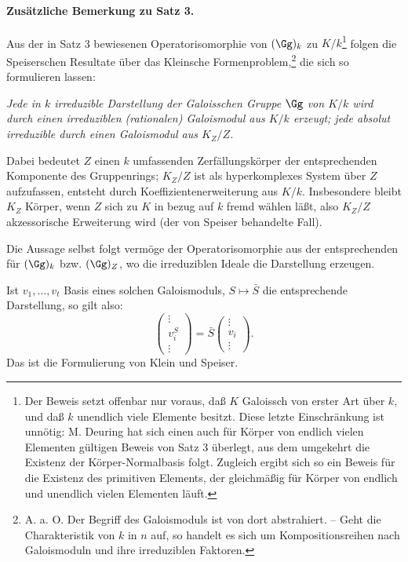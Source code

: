 \paragraph{Zusätzliche Bemerkung zu Satz 3.}
Aus der in Satz 3 bewiesenen Operatorisomorphie von \((\Gg)_k\) zu \(K/k\)\footnote{Der Beweis setzt offenbar nur voraus, daß \(K\) Galoissch von erster Art über \(k\), und daß \(k\) unendlich viele Elemente besitzt. Diese letzte Einschränkung ist unnötig: M. Deuring hat sich einen auch für Körper von endlich vielen Elementen gültigen Beweis von Satz 3 überlegt, aus dem umgekehrt die Existenz der Körper-Normalbasis folgt. Zugleich ergibt sich so ein Beweis für die Existenz des primitiven Elements, der gleichmäßig für Körper von endlich und unendlich vielen Elementen läuft.} folgen die Speiserschen Resultate über das Kleinsche Formenproblem,\footnote{A. a. O. Der Begriff des Galoismoduls ist von dort abstrahiert. -- Geht die Charakteristik von \(k\) in \(n\) auf, so handelt es sich um Kompositionsreihen nach Galoismoduln und ihre irreduziblen Faktoren.} die sich so formulieren lassen:

\emph{Jede in \(k\) irreduzible Darstellung der Galoisschen Gruppe \(\Gg\) von \(K/k\) wird durch einen irreduziblen (rationalen) Galoismodul aus \(K/k\) erzeugt; jede absolut irreduzible durch einen Galoismodul aus \(K_Z/Z\).}

Dabei bedeutet \(Z\) einen \(k\) umfassenden Zerfällungskörper der entsprechenden Komponente des Gruppenrings; \(K_Z/Z\) ist als hyperkomplexes System über \(Z\) aufzufassen, entsteht durch Koeffizientenerweiterung aus \(K/k\). Insbesondere bleibt \(K_Z\) Körper, wenn \(Z\) sich zu \(K\) in bezug auf \(k\) fremd wählen läßt, also \(K_Z/Z\) akzessorische Erweiterung wird (der von Speiser behandelte Fall).

Die Aussage selbst folgt vermöge der Operatorisomorphie aus der entsprechenden für \((\Gg)_k\) bzw. \((\Gg)_Z\), wo die irreduziblen Ideale die Darstellung erzeugen.

Ist \(v_1,\ldots,v_t\) Basis eines solchen Galoismoduls, \(S\mapsto \bar S\) die entsprechende Darstellung, so gilt also:
\[
        \begin{pmatrix}\vdots\\ v_i^S\\ \vdots\end{pmatrix}
        =\bar S\begin{pmatrix}\vdots\\ v_i\\ \vdots\end{pmatrix}.
\]
Das ist die Formulierung von Klein und Speiser.

